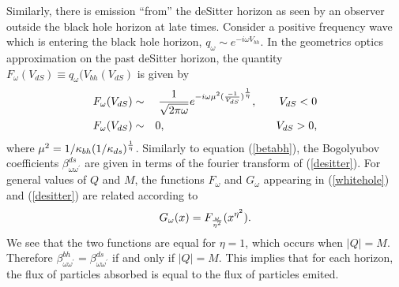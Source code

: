 \documentclass[12pt]{article}
\newcommand{\be}{\begin{equation}}
\newcommand{\ee}{\end{equation}}
\def\bena{\begin{eqnarray}}
\def\eena{\end{eqnarray}}
\def\q{q_{\omega}}
\def\kbh{\kappa_{bh}}
\def\kds{\kappa_{ds}}
\def\bwwp{\beta_{\omega\omega^\prime}}
\def\bwwpbh{\bwwp^{bh}}
\def\bwwpds{\beta_{\omega\omega^\prime}^{ds}}
\begin{document}
Similarly, there is emission ``from'' the deSitter horizon as seen
by an observer outside the black hole horizon at late times.  Consider
a positive frequency wave which is entering the black hole horizon, $\q
\sim e^{-i\omega
V_{bh}}$. In the geometrics optics approximation on the past deSitter
horizon, the
quantity $F_{\omega}(V_{dS}) \equiv \q (V_{bh} (V_{dS}) $ is given by
%
\bena\label{desitter}
F_{\omega}(V_{dS}) & \sim & {1\over \sqrt{2\pi \omega}}
e^{-i\omega\mu ^2 ({-1\over V_{dS}})^{{1\over \eta}}},\qquad  V_{dS} < 0\\
F_{\omega}(V_{dS}) & \sim & 0, \qquad\qquad\qquad\qquad\qquad V_{dS} >0,
\eena
%
where $\mu ^2 =1/\kbh (1/\kds )^{{1\over \eta}}$.
Similarly to equation (\ref{betabh}), the Bogolyubov coefficients $\bwwpds$
are given in terms
of the fourier transform  of (\ref{desitter}).
For general values of $Q$ and $M$, the functions $F_\omega$ and $G_\omega$
appearing in (\ref{whitehole}) and (\ref{desitter}) are related according to
%
\be\label{relation}
G_{\omega}(x) =F_{{\omega\over\eta ^2}}
(x^{\eta ^2}).  \ee
%
We see that the two functions are equal for
$\eta =1$, which occurs when $|Q|=M$.  Therefore
$\bwwpbh =\bwwpds$ if and only if $|Q|=M$.
This implies that for each horizon, the flux of particles absorbed is equal
to the
flux of particles emited.
\end{document}
